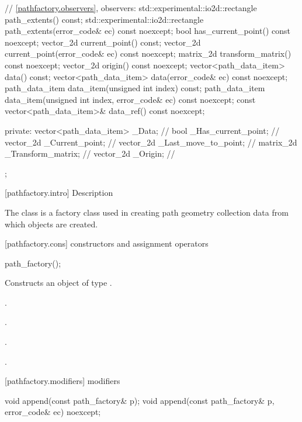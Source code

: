 \begin{codeblock}
{{{{{    // \ref{pathfactory.observers}, observers:
    std::experimental::io2d::rectangle path_extents() const;
    std::experimental::io2d::rectangle path_extents(error_code& ec) const noexcept;
    bool has_current_point() const noexcept;
    vector_2d current_point() const;
    vector_2d current_point(error_code& ec) const noexcept;
    matrix_2d transform_matrix() const noexcept;
    vector_2d origin() const noexcept;
    vector<path_data_item> data() const;
    vector<path_data_item> data(error_code& ec) const noexcept;
    path_data_item data_item(unsigned int index) const;
    path_data_item data_item(unsigned int index, error_code& ec) const noexcept;
    const vector<path_data_item>& data_ref() const noexcept;

  private:
    vector<path_data_item> _Data;  // \expos
    bool _Has_current_point;       // \expos
    vector_2d _Current_point;      // \expos
    vector_2d _Last_move_to_point; // \expos
    matrix_2d _Transform_matrix;   // \expos
    vector_2d _Origin;             // \expos
  };
} } } }
\end{codeblock}

 [pathfactory.intro] { Description}

\pnum
{}
The  class is a factory class used in creating path geometry collection data from which  objects are created.

 [pathfactory.cons] { constructors and 
assignment operators}

\begin{itemdecl}
    path_factory();
\end{itemdecl}
\begin{itemdescr}
	\pnum
	\effects
	Constructs an object of type .
	
	\pnum
	\postconditions
	.
	
	\pnum
	.
	
	\pnum
	.
	
	\pnum
	.
	
\end{itemdescr}

 [pathfactory.modifiers] { modifiers}

\begin{itemdecl}
    void append(const path_factory& p);
    void append(const path_factory& p, error_code& ec) noexcept;
\end{itemdecl}
\begin{itemdescr}
	\pnum
	\postconditions
	
\end{itemdescr}

